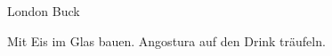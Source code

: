 \documentclass[../recipe-collections/cocktails.tex]{subfiles}
\begin{document}
\begin{recipe}{London Buck}{}{}

  \freeform{}\textit{}


  Mit Eis im Glas bauen. Angostura auf den Drink träufeln.

  \freeform{}\hrulefill{}

\end{recipe}
\end{document}
